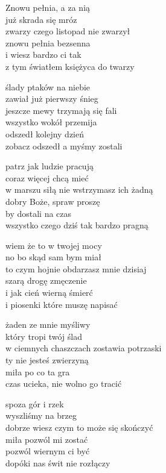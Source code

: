 \begin{text}
    Znowu pełnia, a za nią\\
    już skrada się mróz\\
    zwarzy czego listopad nie zwarzył\\
    znowu pełnia bezsenna\\
    i wiesz bardzo ci tak\\
    z tym światłem księżyca do twarzy

    \vin ślady ptaków na niebie\\
    \vin zawiał już pierwszy śnieg\\
    \vin jeszcze mewy trzymają się fali\\
    \vin wszystko wokół przemija\\
    \vin odszedł kolejny dzień\\
    \vin zobacz odszedł a myśmy zostali

    patrz jak ludzie pracują\\
    coraz więcej chcą mieć\\
    w marszu siłą nie wstrzymasz ich żadną\\
    dobry Boże, spraw proszę\\
    by dostali na czas\\
    wszystko czego dziś tak bardzo pragną

    \vin wiem że to w twojej mocy\\
    \vin no bo skąd sam bym miał\\
    \vin to czym hojnie obdarzasz mnie dzisiaj\\
    \vin szarą drogę zmęczenie\\
    \vin i jak cień wierną śmierć\\
    \vin i piosenki które muszę napisać

    żaden ze mnie myśliwy\\
    który tropi twój ślad\\
    w ciemnych chaszczach zostawia potrzaski\\
    ty nie jesteś zwierzyną\\
    miła po co ta gra\\
    czas ucieka, nie wolno go tracić

    \vin spoza gór i rzek\\
    \vin wyszliśmy na brzeg\\
    \vin dobrze wiesz czym to może się skończyć\\
    \vin miła pozwól mi zostać\\
    \vin pozwól wiernym ci być\\
    \vin dopóki nas świt nie rozłączy
\end{text}
